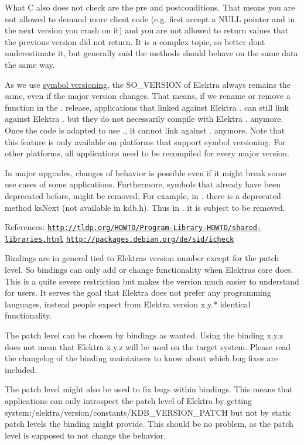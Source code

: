 What C also does not check are the pre and postconditions. That means you are not allowed to demand more client code (e.\+g. first accept a N\+U\+LL pointer and in the next version you crash on it) and you are not allowed to return values that the previous version did not return. It is a complex topic, so better don\textquotesingle{}t underestimate it, but generally said the methods should behave on the same data the same way.

As we use \hyperlink{doc_dev_symbol-versioning_md}{symbol versioning}, the S\+O\+\_\+\+V\+E\+R\+S\+I\+ON of Elektra always remains the same, even if the major version changes. That means, if we rename or remove a function in the {.} release, applications that linked against Elektra {.} can still link against Elektra {.} but they do not necessarily compile with Elektra {.} anymore. Once the code is adapted to use {.}, it cannot link against {.} anymore. Note that this feature is only available on platforms that support symbol versioning. For other platforms, all applications need to be recompiled for every major version.

In major upgrades, changes of behavior is possible even if it might break some use cases of some applications. Furthermore, symbols that already have been deprecated before, might be removed. For example, in {.} there is a deprecated method {\ttfamily ks\+Next} (not available in {\ttfamily kdb.\+h}). Thus in {.} it is subject to be removed.

References\+: \href{http://tldp.org/HOWTO/Program-Library-HOWTO/shared-libraries.html}{\tt http\+://tldp.\+org/\+H\+O\+W\+T\+O/\+Program-\/\+Library-\/\+H\+O\+W\+T\+O/shared-\/libraries.\+html} \href{http://packages.debian.org/de/sid/icheck}{\tt http\+://packages.\+debian.\+org/de/sid/icheck}

Bindings are in general tied to Elektra\textquotesingle{}s version number except for the patch level. So bindings can only add or change functionality when Elektra\textquotesingle{}s core does. This is a quite severe restriction but makes the version much easier to understand for users. It serves the goal that Elektra does not prefer any programming languages, instead people expect from Elektra version {\ttfamily x.\+y.$\ast$} identical functionality.

The patch level can be chosen by bindings as wanted. Using the binding {\ttfamily x.\+y.\+z} does not mean that Elektra {\ttfamily x.\+y.\+z} will be used on the target system. Please read the changelog of the binding maintainers to know about which bug fixes are included.

The patch level might also be used to fix bugs within bindings. This means that applications can only introspect the patch level of Elektra by getting {\ttfamily system\+:/elektra/version/constants/\+K\+D\+B\+\_\+\+V\+E\+R\+S\+I\+O\+N\+\_\+\+P\+A\+T\+CH} but not by static patch levels the binding might provide. This should be no problem, as the patch level is supposed to not change the behavior. 